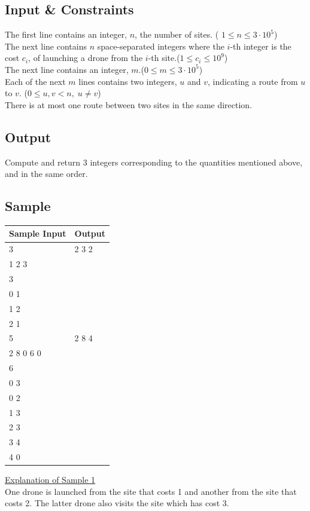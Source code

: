 \documentclass[a4paper]{exam}
\begin{document}
\begin{questions}
	\subsection*{Input \& Constraints}
	The first line contains an integer, $n$, the number of sites. ( $1\leq n\leq 3\cdot 10^5$)\\
	The next line contains $n$ space-separated integers where the $i$-th integer is the cost $c_i$, of launching a drone from the $i$-th site.($1\leq c_i\leq 10^9$) \\
	The next line contains an integer, $m$.($0\leq m\leq 3\cdot 10^5$) \\
	Each of the next $m$ lines contains two integers, $u$ and $v$, indicating a route from $u$ to $v$. ($0\leq u,v<n,\; u\neq v$)\\
	There is at most one route between two sites in the same direction.

	\subsection*{Output}
	Compute and return 3 integers corresponding to the quantities mentioned above, and in the same order.

	\subsection*{Sample}

	\begin{minipage}[t]{.3\textwidth}
		\begin{tabular}[t]{|l|l|}
			\hline
			Sample Input & Output \\
			\hline
			3            & 2 3 2  \\
			1 2 3        &        \\
			3            &        \\
			0 1          &        \\
			1 2          &        \\
			2 1          &        \\
			\hline
			5            & 2 8 4  \\
			2 8 0 6 0    &        \\
			6            &        \\
			0 3          &        \\
			0 2          &        \\
			1 3          &        \\
			2 3          &        \\
			3 4          &        \\
			4 0          &        \\
			\hline
		\end{tabular}
	\end{minipage}
	\begin{minipage}[t]{.65\textwidth}
		\vspace{10pt}
		\underline{Explanation of Sample 1}\\
		One drone is launched from the site that costs 1 and another from the site that costs 2. The latter drone also visits the site which has cost 3.
	\end{minipage}


\end{questions}
\end{document}
